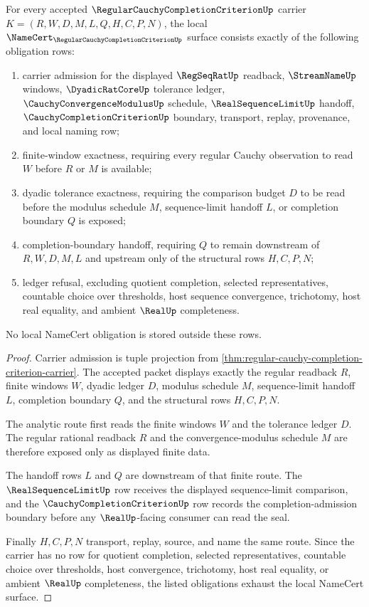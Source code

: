 \begin{theorem}
\label{thm:regular-cauchy-completion-criterion-classifier}
For every accepted $\RegularCauchyCompletionCriterionUp$ carrier $K=(R,W,D,M,L,Q,H,C,P,N)$, the local $\NameCert_{\RegularCauchyCompletionCriterionUp}$ surface consists exactly of the following obligation rows:
\begin{enumerate}
\item carrier admission for the displayed $\RegSeqRatUp$ readback, $\StreamNameUp$ windows, $\DyadicRatCoreUp$ tolerance ledger, $\CauchyConvergenceModulusUp$ schedule, $\RealSequenceLimitUp$ handoff, $\CauchyCompletionCriterionUp$ boundary, transport, replay, provenance, and local naming row;
\item finite-window exactness, requiring every regular Cauchy observation to read $W$ before $R$ or $M$ is available;
\item dyadic tolerance exactness, requiring the comparison budget $D$ to be read before the modulus schedule $M$, sequence-limit handoff $L$, or completion boundary $Q$ is exposed;
\item completion-boundary handoff, requiring $Q$ to remain downstream of $R,W,D,M,L$ and upstream only of the structural rows $H,C,P,N$;
\item ledger refusal, excluding quotient completion, selected representatives, countable choice over thresholds, host sequence convergence, trichotomy, host real equality, and ambient $\RealUp$ completeness.
\end{enumerate}
No local NameCert obligation is stored outside these rows.
\end{theorem}
\begin{proof}
Carrier admission is tuple projection from \autoref{thm:regular-cauchy-completion-criterion-carrier}. The accepted packet displays exactly the regular readback $R$, finite windows $W$, dyadic ledger $D$, modulus schedule $M$, sequence-limit handoff $L$, completion boundary $Q$, and the structural rows $H,C,P,N$.

The analytic route first reads the finite windows $W$ and the tolerance ledger $D$. The regular rational readback $R$ and the convergence-modulus schedule $M$ are therefore exposed only as displayed finite data.

The handoff rows $L$ and $Q$ are downstream of that finite route. The $\RealSequenceLimitUp$ row receives the displayed sequence-limit comparison, and the $\CauchyCompletionCriterionUp$ row records the completion-admission boundary before any $\RealUp$-facing consumer can read the seal.

Finally $H,C,P,N$ transport, replay, source, and name the same route. Since the carrier has no row for quotient completion, selected representatives, countable choice over thresholds, host convergence, trichotomy, host real equality, or ambient $\RealUp$ completeness, the listed obligations exhaust the local NameCert surface.
\end{proof}

